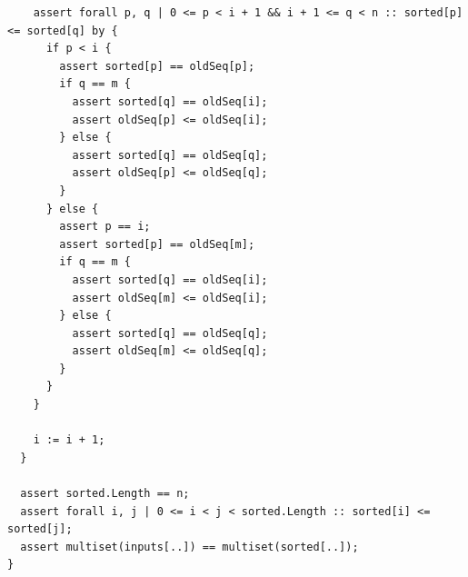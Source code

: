 \documentclass{article}
\begin{document}
\begin{lstlisting}
    assert forall p, q | 0 <= p < i + 1 && i + 1 <= q < n :: sorted[p] <= sorted[q] by {
      if p < i {
        assert sorted[p] == oldSeq[p];
        if q == m {
          assert sorted[q] == oldSeq[i];
          assert oldSeq[p] <= oldSeq[i];
        } else {
          assert sorted[q] == oldSeq[q];
          assert oldSeq[p] <= oldSeq[q];
        }
      } else {
        assert p == i;
        assert sorted[p] == oldSeq[m];
        if q == m {
          assert sorted[q] == oldSeq[i];
          assert oldSeq[m] <= oldSeq[i];
        } else {
          assert sorted[q] == oldSeq[q];
          assert oldSeq[m] <= oldSeq[q];
        }
      }
    }

    i := i + 1;
  }

  assert sorted.Length == n;
  assert forall i, j | 0 <= i < j < sorted.Length :: sorted[i] <= sorted[j];
  assert multiset(inputs[..]) == multiset(sorted[..]);
}
\end{lstlisting}
\end{document}
